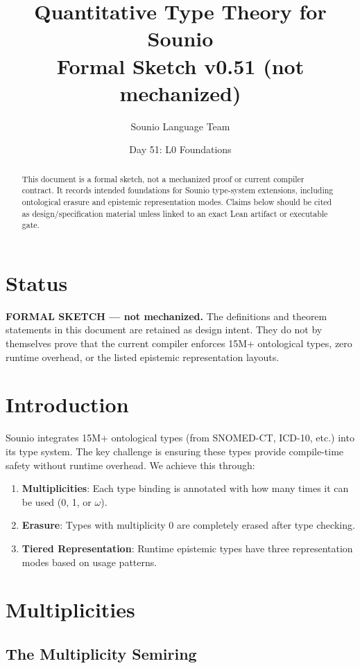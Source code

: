 \documentclass[11pt]{article}
\title{Quantitative Type Theory for Sounio\\
\large Formal Sketch v0.51 (not mechanized)}
\author{Sounio Language Team}
\date{Day 51: L0 Foundations}
\begin{document}
\maketitle

\begin{abstract}
This document is a formal sketch, not a mechanized proof or current compiler
contract. It records intended foundations for Sounio type-system extensions,
including ontological erasure and epistemic representation modes. Claims below
should be cited as design/specification material unless linked to an exact
Lean artifact or executable gate.
\end{abstract}

\section*{Status}

\textbf{FORMAL SKETCH --- not mechanized.} The definitions and theorem
statements in this document are retained as design intent. They do not by
themselves prove that the current compiler enforces 15M+ ontological types,
zero runtime overhead, or the listed epistemic representation layouts.

\section{Introduction}

Sounio integrates 15M+ ontological types (from SNOMED-CT, ICD-10, etc.)
into its type system. The key challenge is ensuring these types provide
compile-time safety without runtime overhead. We achieve this through:

\begin{enumerate}
\item \textbf{Multiplicities}: Each type binding is annotated with how many
      times it can be used (0, 1, or $\omega$).
\item \textbf{Erasure}: Types with multiplicity 0 are completely erased
      after type checking.
\item \textbf{Tiered Representation}: Runtime epistemic types have three
      representation modes based on usage patterns.
\end{enumerate}

\section{Multiplicities}

\subsection{The Multiplicity Semiring}
\end{document}
